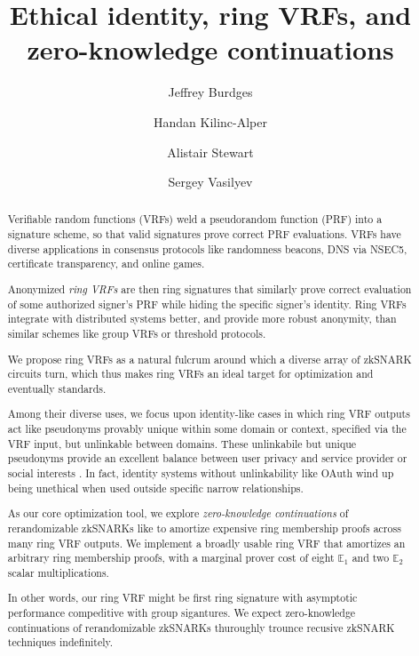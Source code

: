 \documentclass[runningheads,evcountsame,a4paper,11pt,orivec]{llncs}
\title{Ethical identity, ring VRFs, and zero-knowledge continuations}
\author{Jeffrey Burdges \and Handan Kilinc-Alper \and Alistair Stewart \and Sergey Vasilyev}
\date{}
\institute{Web 3.0 Foundation}
\begin{document}
	
\maketitle

\begin{abstract}
Verifiable random functions (VRFs) weld a pseudorandom function (PRF) into
a signature scheme, so that valid signatures prove correct PRF evaluations.
VRFs have diverse applications in consensus protocols like randomness
beacons, DNS via NSEC5, certificate transparency, and online games.

Anonymized {\em ring VRFs} are then ring signatures that similarly prove
correct evaluation of some authorized signer's PRF while hiding the
specific signer's identity.
Ring VRFs integrate with distributed systems better, and provide more robust
anonymity, than similar schemes like group VRFs or threshold protocols.


We propose ring VRFs as a natural fulcrum around which a diverse array of
zkSNARK circuits turn, which thus makes ring VRFs an ideal target
for optimization and eventually standards. 

%

Among their diverse uses, we focus upon identity-like cases in which
ring VRF outputs act like pseudonyms provably unique within some domain or
context, specified via the VRF input, but unlinkable between domains. 
These unlinkabile but unique pseudonyms provide an excellent balance between
user privacy and service provider or social interests \cite{pop2008}.
%
In fact, identity systems without unlinkability like OAuth wind up being
unethical when used outside specific narrow relationships.

%

As our core optimization tool, we explore {\em zero-knowledge continuations}
of rerandomizable zkSNARKs like \cite{groth16} to amortize expensive
ring membership proofs across many ring VRF outputs. 
%
We implement a broadly usable ring VRF that amortizes an arbitrary
ring membership proofs, with a marginal prover cost
 of eight $\mathbb{E}_1$ and two $\mathbb{E}_2$ scalar multiplications.

In other words, our ring VRF might be first ring signature with asymptotic
performance compeditive with group sigantures.
%
We expect zero-knowledge continuations of rerandomizable zkSNARKs
thuroughly trounce recusive zkSNARK techniques indefinitely.
\end{abstract}



% 

















\end{document}
